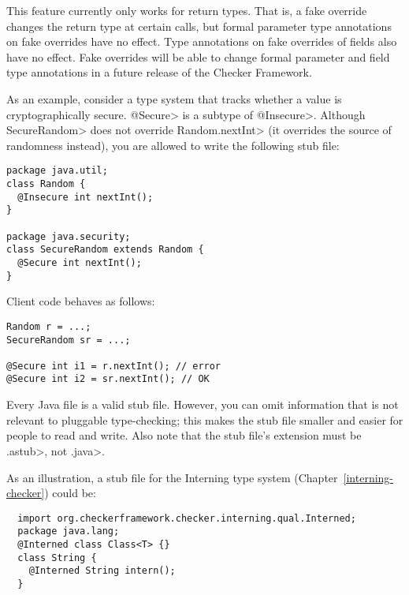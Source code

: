 This feature currently only works for return types.  That is, a fake
override changes the return type at certain calls, but formal parameter
type annotations on fake overrides have no effect.  Type annotations on
fake overrides of fields also have no effect.  Fake overrides will be able
to change formal parameter and field type annotations in a future release
of the Checker Framework.



As an example, consider a type system that tracks whether a value is
cryptographically secure.  \<@Secure> is a subtype of \<@Insecure>.
Although \<SecureRandom> does not override \<Random.nextInt> (it overrides
the source of randomness instead), you are allowed to write the following
stub file:

\begin{Verbatim}
package java.util;
class Random {
  @Insecure int nextInt();
}

package java.security;
class SecureRandom extends Random {
  @Secure int nextInt();
}
\end{Verbatim}

Client code behaves as follows:

\begin{Verbatim}
Random r = ...;
SecureRandom sr = ...;

@Secure int i1 = r.nextInt(); // error
@Secure int i2 = sr.nextInt(); // OK
\end{Verbatim}



Every Java file is a valid stub file.  However, you can omit information
that is not relevant to pluggable type-checking; this makes the stub file
smaller and easier for people to read and write.
Also note that the stub file's extension must be \<.astub>, not \<.java>.

As an illustration, a stub file for the Interning type system
(Chapter~\ref{interning-checker}) could be:

\begin{Verbatim}
  import org.checkerframework.checker.interning.qual.Interned;
  package java.lang;
  @Interned class Class<T> {}
  class String {
    @Interned String intern();
  }
\end{Verbatim}

